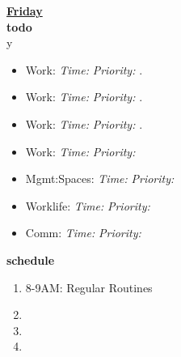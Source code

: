 \documentclass[11pt]{article}
\newcommand{\timeEst}[1]{\textit{Time:} \textit{#1}}
\newcommand{\priority}[1]{\textit{Priority:} \textit{#1}}
\newcommand{\deadline}[1]{#1}
\begin{document}
{            \textbf{\small \underline{Friday}} \\
            \textbf{\small todo} \\
y            \begin{itemize} 
              \tiny \item \tiny Work:                                      \deadline{} \timeEst{} \priority{}. 
            \item \tiny Work:                                              \deadline{ }   \timeEst{}  \priority{}.
            \item \tiny Work:                                              \deadline{ }   \timeEst{}  \priority{}. 
            \item \tiny Work:                                              \deadline{} \timeEst{} \priority{} 
            \item \tiny Mgmt:Spaces:                                       \deadline{} \timeEst{} \priority{} 
            \item \tiny Worklife:                                          \deadline{} \timeEst{} \priority{} 
            \item \tiny Comm:                                              \deadline{} \timeEst{} \priority{} 
            \end{itemize}
            \textbf{\small schedule} \\
            \begin{enumerate}
              \tiny \item \tiny 8-9AM: Regular Routines 
            \item \tiny 
            \item \tiny 
            \item \tiny   
            \end{enumerate} 
            
}
\end{document}

